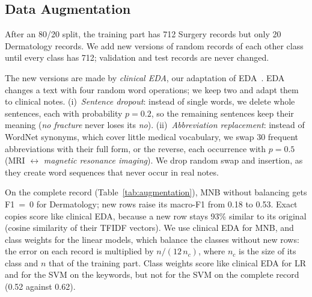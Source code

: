 \documentclass[twocolumn,10pt]{article}
\begin{document}
\subsection{Data Augmentation}
\label{sec:augmentation}

After an 80/20 split, the training part has 712 Surgery records but only 20 Dermatology records. We add new versions of random records of each other class until every class has 712; validation and test records are never changed.

The new versions are made by \emph{clinical \acs{EDA}}, our adaptation of \acl{EDA}~\citep[\acs{EDA};][]{wei2019eda}. \acs{EDA} changes a text with four random word operations; we keep two and adapt them to clinical notes. (i)~\emph{Sentence dropout}: instead of single words, we delete whole sentences, each with probability $p=0.2$, so the remaining sentences keep their meaning (\emph{no fracture} never loses its \emph{no}). (ii)~\emph{Abbreviation replacement}: instead of WordNet synonyms, which cover little medical vocabulary, we swap 30 frequent abbreviations with their full form, or the reverse, each occurrence with $p=0.5$ (MRI $\leftrightarrow$ \emph{magnetic resonance imaging}). We drop random swap and insertion, as they create word sequences that never occur in real notes.


On the complete record (Table~\ref{tab:augmentation}), \ac{MNB} without balancing gets F1~=~0 for Dermatology; new rows raise its macro-F1 from 0.18 to 0.53. Exact copies score like clinical \acs{EDA}, because a new row stays 93\% similar to its original (cosine similarity of their \ac{TFIDF} vectors). We use clinical \acs{EDA} for \ac{MNB}, and class weights for the linear models, which balance the classes without new rows: the error on each record is multiplied by $n/(12\,n_c)$, where $n_c$ is the size of its class and $n$ that of the training part. Class weights score like clinical \acs{EDA} for \ac{LR} and for the \ac{SVM} on the keywords, but not for the \ac{SVM} on the complete record (0.52 against 0.62).
\end{document}

